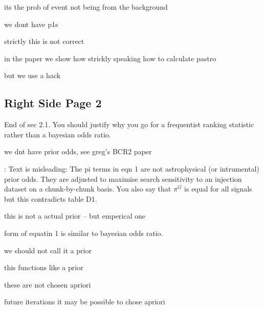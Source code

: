 \documentclass[11pt,leqno]{article}
\begin{document}
its the prob of event not being from the background

we dont have p1s 

strictly this is not correct 

in the paper we show how strickly speaking how to calculate pastro

but we use a hack




\subsection*{Right Side Page 2} 
\begin{tcolorbox}[left = 1em, top = 1ex, bottom = 1ex, colupper=black, colback=black!10, adjusted title =  Comment 1]
    \setlength\parindent{2em}
	\noindent
	\ttfamily
    End of sec 2.1. You should justify why you go for a frequentist ranking statistic rather than a bayesian odds ratio.
\end{tcolorbox}


we dnt have prior odds, see greg's BCR2 paper



\begin{tcolorbox}[left = 1em, top = 1ex, bottom = 1ex, colupper=black, colback=black!10, adjusted title =  Comment 2]
    \setlength\parindent{2em}
	\noindent
	: Text is misleading: The pi terms in eqn 1 are not astrophysical (or intrumental) prior odds. They are adjusted to maximise search sensitivity to an injection dataset on a chunk-by-chunk basis. You also say that $\pi^G$ is equal for all signals but this contradicts table D1.
\end{tcolorbox}

this is not a actual prior -- but emperical one

form of equatin 1 is similar to bayesian odds ratio. 

we should not call it a prior 

this functions like a prior 

these are not chosen apriori 

future iterations it may be possible to chose apriori 
\end{document}

